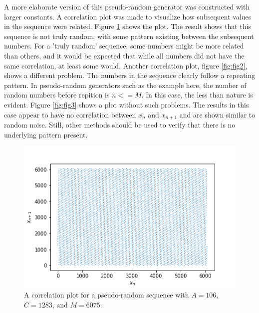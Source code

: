 \documentclass[twocolumn]{article}
\begin{document}
A more elaborate version of this pseudo-random generator was constructed with larger constants. A correlation plot was made to visualize how subsequent values in the sequence were related. Figure \ref{fig:fig1} shows the plot. The result shows that this sequence is not truly random, with some pattern existing between the subsequent numbers. For a 'truly random' sequence, some numbers might be more related than others, and it would be expected that while all numbers did not have the same correlation, at least some would. Another correlation plot, figure \ref{fig:fig2}, shows a different problem. The numbers in the sequence clearly follow a repeating pattern. In pseudo-random generators such as  the example here, the number of random numbers before repition is $n <= M$. In this case, the less than nature is evident. Figure \ref{fig:fig3} shows a plot without such problems. The results in this case appear to have no correlation between $x_n$ and $x_{n+1}$ and are shown similar to random noise. Still, other methods should be used to verify that there is no underlying pattern present. 

\begin{figure}
\centering
\includegraphics[width=\linewidth]{fig1}
\caption{A correlation plot for a pseudo-random sequence with $A=106$, $C=1283$, and $M=6075$.}
\label{fig:fig1}
\end{figure}
\end{document}
